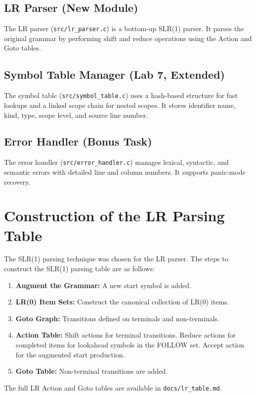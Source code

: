 \documentclass[12pt,a4paper]{article}
\begin{document}
\subsection{LR Parser (New Module)}
The LR parser (\texttt{src/lr\_parser.c}) is a bottom-up SLR(1) parser. It parses the original grammar by performing shift and reduce operations using the Action and Goto tables.

\subsection{Symbol Table Manager (Lab 7, Extended)}
The symbol table (\texttt{src/symbol\_table.c}) uses a hash-based structure for fast lookups and a linked scope chain for nested scopes. It stores identifier name, kind, type, scope level, and source line number.

\subsection{Error Handler (Bonus Task)}
The error handler (\texttt{src/error\_handler.c}) manages lexical, syntactic, and semantic errors with detailed line and column numbers. It supports panic-mode recovery.

\section{Construction of the LR Parsing Table}
The SLR(1) parsing technique was chosen for the LR parser.
The steps to construct the SLR(1) parsing table are as follows:
\begin{enumerate}
    \item \textbf{Augment the Grammar:} A new start symbol is added.
    \item \textbf{LR(0) Item Sets:} Construct the canonical collection of LR(0) items.
    \item \textbf{Goto Graph:} Transitions defined on terminals and non-terminals.
    \item \textbf{Action Table:} Shift actions for terminal transitions. Reduce actions for completed items for lookahead symbols in the FOLLOW set. Accept action for the augmented start production.
    \item \textbf{Goto Table:} Non-terminal transitions are added.
\end{enumerate}

The full LR Action and Goto tables are available in \texttt{docs/lr\_table.md}.
\end{document}
